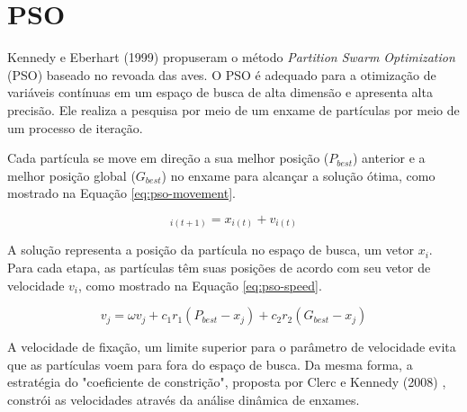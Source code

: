 \section{PSO}
\label{sec-pso}

Kennedy e Eberhart (1999) \cite{kennedy1999particle} propuseram o método \textit{Partition Swarm Optimization} (PSO) baseado no revoada das aves. O PSO é adequado para a otimização de variáveis contínuas em um espaço de busca de alta dimensão e apresenta alta precisão. Ele realiza a pesquisa por meio de um enxame de partículas por meio de um processo de iteração.


Cada partícula se move em direção a sua melhor posição ($P_{best}$) anterior e a melhor posição global ($G_{best}$) no enxame para alcançar a solução ótima, como mostrado na Equação \ref{eq:pso-movement}.

\begin{equation} \label{eq:pso-movement}
    _{i(t+1)} = x_{i(t)} + v_{i(t)}
\end{equation}

A solução representa a posição da partícula no espaço de busca, um vetor $x_i$. Para cada etapa, as partículas têm suas posições de acordo com seu vetor de velocidade $v_i$, como mostrado na Equação \ref{eq:pso-speed}.

\begin{equation} \label{eq:pso-speed}
    v_j = \omega v_j + c_1 r_1(P_{best} - x_j) + c_2 r_2(G_{best} - x_j)
\end{equation} 

A velocidade de fixação, um limite superior para o parâmetro de velocidade evita que as partículas voem para fora do espaço de busca. Da mesma forma, a estratégia do "coeficiente de constrição", proposta por Clerc e Kennedy (2008) \cite{clerc2002particle}, constrói as velocidades através da análise dinâmica de enxames.

